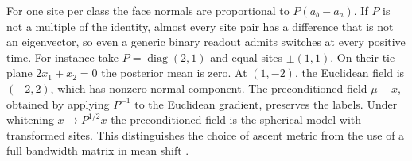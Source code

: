 For one site per class the face normals are proportional to
$P(a_b-a_a)$. If $P$ is not a multiple of the identity, almost every
site pair has a difference that is not an eigenvector, so even a
generic binary readout admits switches at every positive time.
For instance take $P=\operatorname{diag}(2,1)$ and equal sites
$\pm(1,1)$. On their tie plane $2x_1+x_2=0$ the posterior mean is zero.
At $(1,-2)$, the Euclidean field is $(-2,2)$, which has nonzero
normal component. The preconditioned field $\mu-x$, obtained by
applying $P^{-1}$ to the Euclidean gradient, preserves the labels.
Under whitening $x\mapsto P^{1/2}x$ the preconditioned field is
the spherical model with transformed sites. This distinguishes
the choice of ascent metric from the use of a full bandwidth matrix
in mean shift \cite{chaconduong}.

